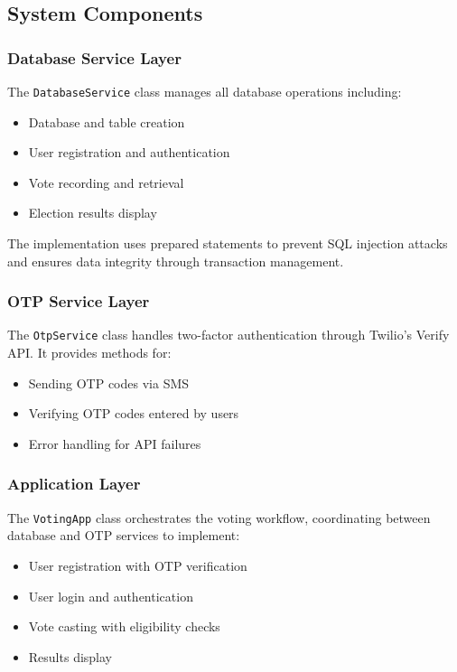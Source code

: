 \documentclass[conference]{IEEEtran}
\begin{document}
\subsection{System Components}

\subsubsection{Database Service Layer}
The \texttt{DatabaseService} class manages all database operations including:
\begin{itemize}
    \item Database and table creation
    \item User registration and authentication
    \item Vote recording and retrieval
    \item Election results display
\end{itemize}

The implementation uses prepared statements to prevent SQL injection attacks and ensures data integrity through transaction management.

\subsubsection{OTP Service Layer}
The \texttt{OtpService} class handles two-factor authentication through Twilio's Verify API. It provides methods for:
\begin{itemize}
    \item Sending OTP codes via SMS
    \item Verifying OTP codes entered by users
    \item Error handling for API failures
\end{itemize}

\subsubsection{Application Layer}
The \texttt{VotingApp} class orchestrates the voting workflow, coordinating between database and OTP services to implement:
\begin{itemize}
    \item User registration with OTP verification
    \item User login and authentication
    \item Vote casting with eligibility checks
    \item Results display
\end{itemize}
\end{document}

